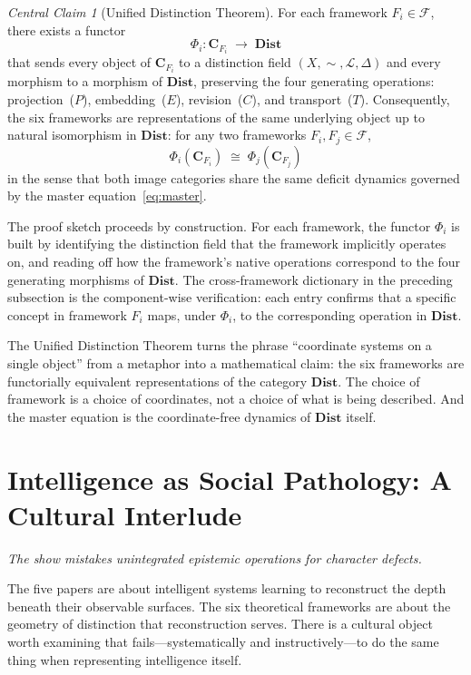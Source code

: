 \documentclass[12pt, letterpaper]{article}
\theoremstyle{remark}
\newtheorem*{claim}{Central Claim}
\begin{document}
\begin{claim}[Unified Distinction Theorem]
For each framework $F_i \in \mathcal{F}$, there exists a functor
\[
  \Phi_i : \mathbf{C}_{F_i} \;\longrightarrow\; \mathbf{Dist}
\]
that sends every object of $\mathbf{C}_{F_i}$ to a distinction field
$(X, {\sim}, \mathcal{L}, \Delta)$ and every morphism to a morphism of
$\mathbf{Dist}$, preserving the four generating operations:
projection~($P$), embedding~($E$), revision~($C$), and transport~($T$).
Consequently, the six frameworks are representations of the same underlying
object up to natural isomorphism in $\mathbf{Dist}$: for any two frameworks
$F_i, F_j \in \mathcal{F}$,
\[
  \Phi_i(\mathbf{C}_{F_i}) \;\cong\; \Phi_j(\mathbf{C}_{F_j})
\]
in the sense that both image categories share the same deficit dynamics
governed by the master equation~\eqref{eq:master}.
\end{claim}

The proof sketch proceeds by construction.  For each framework, the functor
$\Phi_i$ is built by identifying the distinction field that the framework
implicitly operates on, and reading off how the framework's native operations
correspond to the four generating morphisms of $\mathbf{Dist}$.  The
cross-framework dictionary in the preceding subsection is the component-wise
verification: each entry confirms that a specific concept in framework $F_i$
maps, under $\Phi_i$, to the corresponding operation in $\mathbf{Dist}$.

The Unified Distinction Theorem turns the phrase ``coordinate systems on a
single object'' from a metaphor into a mathematical claim: the six frameworks
are functorially equivalent representations of the category $\mathbf{Dist}$.
The choice of framework is a choice of coordinates, not a choice of what is
being described.  And the master equation is the coordinate-free dynamics
of $\mathbf{Dist}$ itself.

\section{Intelligence as Social Pathology: A Cultural Interlude}

\epigraph{\itshape The show mistakes unintegrated epistemic operations for
character defects.}{}

The five papers are about intelligent systems learning to reconstruct the
depth beneath their observable surfaces.  The six theoretical frameworks are
about the geometry of distinction that reconstruction serves.  There is a
cultural object worth examining that fails---systematically and
instructively---to do the same thing when representing intelligence itself.
\end{document}
